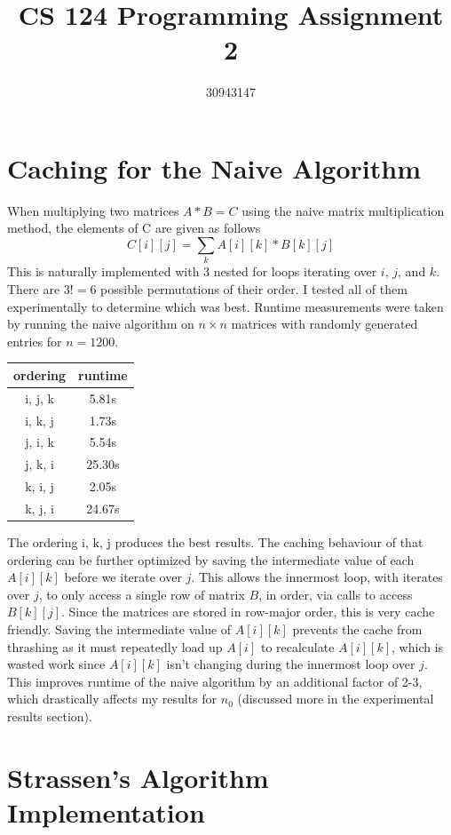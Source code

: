 \documentclass{article}
\begin{document}
\title{CS 124 Programming Assignment 2}
\author{30943147}
\maketitle
\section*{Caching for the Naive Algorithm}
When multiplying two matrices $A*B=C$ using the naive matrix multiplication method, the elements of C are given as follows
$$C[i][j] = \sum\limits_k A[i][k]*B[k][j]$$
This is naturally implemented with 3 nested for loops iterating over $i$, $j$, and $k$. There are $3!=6$ possible permutations of their order. I tested all of them experimentally to determine which was best. Runtime measurements were taken by running the naive algorithm on $n \times n$ matrices with randomly generated entries for $n=1200$. 
\begin{center}
\begin{tabular}{ |c|c| } 
 \hline
 ordering & runtime\\ 
\hline
 i, j, k &  5.81s \\ 
\hline
 i, k, j & 1.73s \\ 
\hline
j, i, k & 5.54s \\
\hline
j, k, i & 25.30s\\
\hline
k, i, j & 2.05s \\
\hline
k, j, i & 24.67s\\
 \hline
\end{tabular}
\end{center}
The ordering i, k, j produces the best results. The caching behaviour of that ordering can be further optimized by saving the intermediate value of each $A[i][k]$ before we iterate over $j$. This allows the innermost loop, with iterates over $j$, to only access a single row of matrix $B$, in order, via calls to access $B[k][j]$. Since the matrices are stored in row-major order, this is very cache friendly. Saving the intermediate value of $A[i][k]$ prevents the cache from thrashing as it must repeatedly load up $A[i]$ to recalculate $A[i][k]$, which is wasted work since $A[i][k]$ isn't changing during the innermost loop over $j$. This improves runtime of the naive algorithm by an additional factor of 2-3, which drastically affects my results for $n_0$ (discussed more in the experimental results section).  

\section*{Strassen's Algorithm Implementation}
\end{document}
